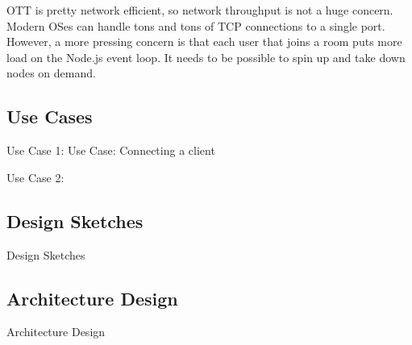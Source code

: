OTT is pretty network efficient, so network throughput is not a huge concern. Modern OSes can handle tons and tons of TCP connections to a single port. However, a more pressing concern is that each user that joins a room puts more load on the Node.js event loop.
It needs to be possible to spin up and take down nodes on demand.

\subsection{Use Cases}

Use Case 1:
Use Case: Connecting a client 

Use Case 2:


\subsection{Design Sketches}
Design Sketches

\subsection{Architecture Design}
Architecture Design
